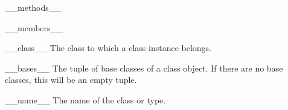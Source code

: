 \begin{memberdesc}[object]{__methods__}
\end{memberdesc}

\begin{memberdesc}[object]{__members__}
\end{memberdesc}

\begin{memberdesc}[instance]{__class__}
The class to which a class instance belongs.
\end{memberdesc}

\begin{memberdesc}[class]{__bases__}
The tuple of base classes of a class object.  If there are no base
classes, this will be an empty tuple.
\end{memberdesc}

\begin{memberdesc}[class]{__name__}
The name of the class or type.
\end{memberdesc}
